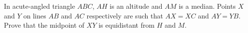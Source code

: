 In acute-angled triangle $ABC$,  $AH$ is an altitude and $AM$ is a median. Points $X$ and $Y$ on lines $AB$ and $AC$ respectively are such that $AX=XC$ and $AY=YB$. Prove that the midpoint of $XY$ is equidistant from $H$ and $M$.